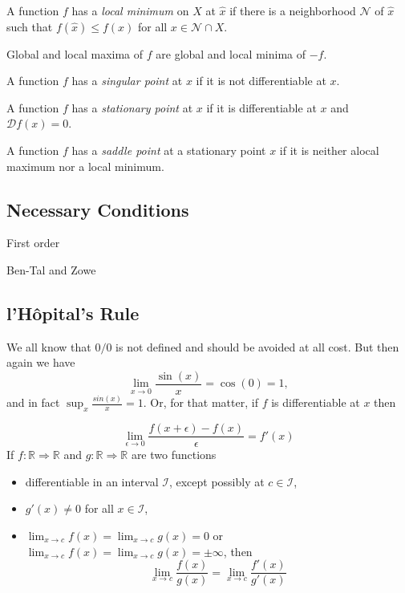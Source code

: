 \documentclass[
  12pt,
]{book}
\providecommand{\tightlist}{%
  \setlength{\itemsep}{0pt}\setlength{\parskip}{0pt}}
\theoremstyle{definition}
\theoremstyle{definition}
\theoremstyle{definition}
\theoremstyle{definition}
\theoremstyle{remark}
\begin{document}
A function \(f\) has a \emph{local minimum} on \(X\) at \(\hat x\) if there is a neighborhood \(\mathcal{N}\) of \(\hat x\) such that \(f(\hat x)\leq f(x)\) for all \(x\in\mathcal{N}\cap X\).

Global and local maxima of \(f\) are global and local minima of \(-f\).

A function \(f\) has a \emph{singular point} at \(x\) if it is not differentiable at \(x\).

A function \(f\) has a \emph{stationary point} at \(x\) if it is differentiable at \(x\) and \(\mathcal{D}f(x)=0\).

A function \(f\) has a \emph{saddle point} at a stationary point \(x\) if it is neither alocal maximum nor a local minimum.

\hypertarget{necessary}{%
\subsection{Necessary Conditions}\label{necessary}}

First order

Ben-Tal and Zowe

\hypertarget{hopital}{%
\subsection{l'Hôpital's Rule}\label{hopital}}

We all know that \(0/0\) is not defined and should be avoided at all cost.
But then again we have
\[
\lim_{x\rightarrow 0}\frac{\sin(x)}{x}=\cos(0)=1,
\]
and in fact \(\sup_x \frac{sin(x)}{x}=1\). Or, for that matter, if \(f\) is differentiable at \(x\) then

\[
\lim_{\epsilon\rightarrow 0}\frac{f(x+\epsilon)-f(x)}{\epsilon}=f'(x)
\]
If \(f:\mathbb{R}\Rightarrow\mathbb{R}\) and \(g:\mathbb{R}\Rightarrow\mathbb{R}\) are two functions

\begin{itemize}
\tightlist
\item
  differentiable in an interval \(\mathcal{I}\), except possibly at \(c\in\mathcal{I}\),
\item
  \(g'(x)\not=0\) for all \(x\in\mathcal{I}\),
\item
  \(\lim_{x\rightarrow c}f(x)=\lim_{x\rightarrow c}g(x)=0\) or
  \(\lim_{x\rightarrow c}f(x)=\lim_{x\rightarrow c}g(x)=\pm\infty\),
  then
  \[
  \lim_{x\rightarrow c}\frac{f(x)}{g(x)}=\lim_{x\rightarrow c}\frac{f'(x)}{g'(x)}
  \]
\end{itemize}
\end{document}
